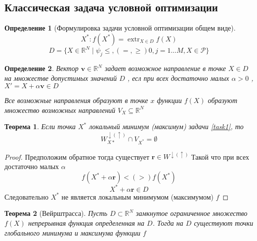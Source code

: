 \documentclass[14pt]{extarticle}
\newtheorem{theorem}{Теорема}
\newtheorem{definiiton}{Определение}
\DeclareMathOperator{\extr}{extr}
\begin{document}
\subsection{Классическая задача условной оптимизации}
\begin{definiiton}[Формулировка задачи условной оптимизации  общем виде]
	\begin{equation}
		\label{task1}
		X^{*} : f(X^{*}) = \extr_{X \in D} f(X)
	\end{equation}
	\begin{equation}
		D = \{X \in \mathbb{R}^{N} \mid \psi_{j} \le ,(=,\ge ) 0,j =1 \dots M,X\in \mathcal{P}\}
	\end{equation}
\end{definiiton}
\begin{definiiton}
	Вектор $\mathbf{v} \in \mathbb{R}^{N}$ задает возможное
	направление в точке $X \in D$ на
	множестве допустимых значений  $D$ ,
	есл при всех достаточно малых  $\alpha > 0$ ,
	 $X' = X + \alpha \mathbf{v} \in D$

	 Все возможные направления образуют в точке $x$ 
	 функции  $f(X)$ образуют множество возможных
	 направлений  $V_{X} \subseteq \mathbb{R}^{N}$
\end{definiiton}
\begin{theorem}
	Если точка $X^{*}$ локальный минимум (максимум) 
	задачи \ref{task1}, то
	\begin{equation}
		W_{X*}^{\downarrow (\uparrow)} \cap V_{X^{*}} = \emptyset
	\end{equation}
\end{theorem}
\begin{proof}
	Предположим обратное тогда существует $\mathbf{r} \in W^{\downarrow (\uparrow)}$ 
Такой что при всех достаточно малых $\alpha$
 \begin{equation}
 	f(X^{*} + \alpha \mathbf{r}) < (>) f(X^{*})
 \end{equation}
 \begin{equation}
 	X^{*} + \alpha \mathbf{r} \in D
 \end{equation}
 Следовательно $X^{*}$ не является локальным минимумом (максимумом)
 $f$
\end{proof}
\begin{theorem}[Вейрштрасса]
	Пусть $D \subset \mathbb{R}^{N}$ замкнутое
	ограниченное множество $f(X)$ непрерывная функция
	определенная на  $D$. Тогда на  $D$ существуют точки глобального
	минимума и максимума функции  $f$
\end{theorem}
\end{document}
